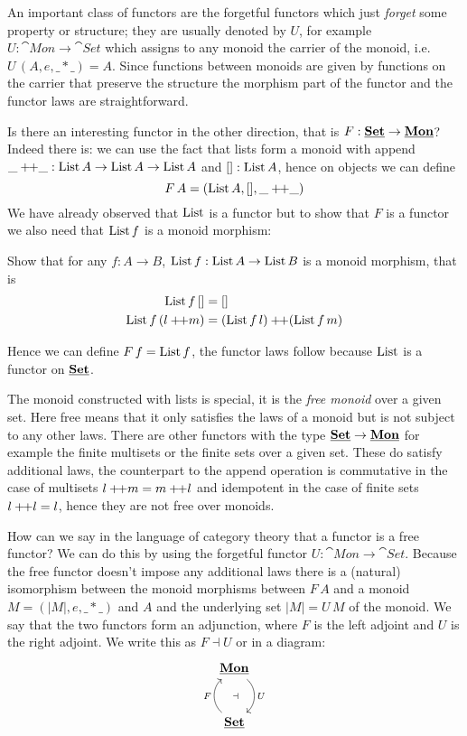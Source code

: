 An important class of functors are the forgetful functors which just \emph{forget} some property or structure; they are usually denoted by $U$, for example $U : \cat{Mon} \to \cat{Set}$ which assigns to any monoid the carrier of the monoid, i.e. $U\,(A,e,\_*\_) = A$. Since functions between monoids are given by functions on the carrier that preserve the structure the morphism part of the functor and the functor laws are straightforward. 

Is there an interesting functor in the other direction, that is $F : \underline{\mathbf{\mathbf{Set}}} \to \underline{\mathbf{Mon}}$? Indeed there is: we can use the fact that lists form a monoid with append $\_+\!\!+\_ : \mathrm{List}\,A \to \mathrm{List}\,A \to \mathrm{List}\,A$ and $[] : \mathrm{List}\,A$, hence on objects we can define
\[ F\,A = (\mathrm{List}\,A, [], \_+\!\!+\_) \]
We have already observed that $\mathrm{List}$ is a functor but to show that $F$ is a functor we also need that $\mathrm{List}\,f$ is a monoid morphism:
\begin{Exercise}
  Show that for any $f:A \to B$, $\mathrm{List}\,f : \mathrm{List}\,A \to \mathrm{List}\,B$ is a monoid morphism, that is
  \begin{align*}
    \mathrm{List}\,f\,[] & = [] \\
    \mathrm{List}\,f\,(l +\!\!+ m) & = (\mathrm{List}\,f\,l) +\!\!+ (\mathrm{List}\,f\,m)
  \end{align*}
\end{Exercise}
Hence we can define $F\,f = \mathrm{List}\,f$, the functor laws follow because $\mathrm{List}$ is a functor on $\underline{\mathbf{\mathbf{Set}}}$.

The monoid constructed with lists is special, it is the \emph{free monoid} over a given set. Here free means that it only satisfies the laws of a monoid but is not subject to any other laws. There are other functors with the type $\underline{\mathbf{\mathbf{Set}}} \to \underline{\mathbf{Mon}}$ for example the finite multisets or the finite sets over a given set. These do satisfy additional laws, the counterpart to the append operation is commutative in the case of multisets $l +\!\!+ m = m +\!\!+ l$ and idempotent in the case of finite sets $l +\!\!+ l = l$, hence they are not free over monoids.

How can we say in the language of category theory that a functor is a free functor? We can do this by using the forgetful functor $U: \cat{Mon} \to \cat{Set}$. Because the free functor doesn't impose any additional laws there is a (natural) isomorphism between the monoid morphisms between $F\,A$ and a monoid $M = (|M|,e,\_*\_)$ and $A$ and the underlying set $|M| = U\,M$
of the monoid. We say that the two functors form an adjunction, where $F$ is the left adjoint and $U$ is the right adjoint. We write this as $F \dashv U$ or in a diagram:
\[\begin{tikzcd}[row sep=large]
\cat{Mon} \arrow[d,bend left = 50,"U" right,"\dashv" left = 10] \\ 
\cat{Set} \arrow[u,bend left = 50,"F" left, ]
\end{tikzcd}\]

